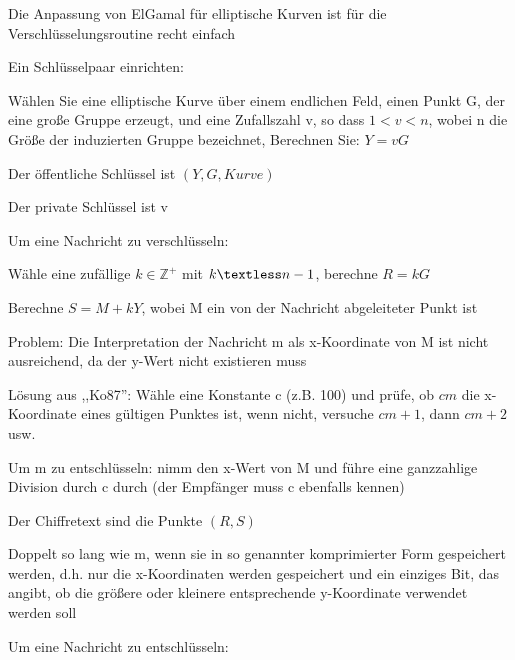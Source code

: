 \documentclass[a4paper]{article}
\begin{document}
\begin{multicols}{3}
      \begin{itemize*}
            \item Die Anpassung von ElGamal für elliptische Kurven ist für die
            Verschlüsselungsroutine recht einfach
            \item Ein Schlüsselpaar einrichten:
            \begin{itemize*}
                  \item Wählen Sie eine elliptische Kurve über einem endlichen Feld, einen Punkt G, der eine große Gruppe erzeugt, und eine Zufallszahl v, so dass $1 < v < n$, wobei n die Größe der induzierten Gruppe bezeichnet, Berechnen Sie: $Y = vG$
                  \item Der öffentliche Schlüssel ist $(Y,G,Kurve)$
                  \item Der private Schlüssel ist v
            \end{itemize*}
            \item Um eine Nachricht zu verschlüsseln:
            \begin{itemize*}
                  \item Wähle eine zufällige $k\in\mathbb{Z}^+$ mit $k\textless n-1$, berechne $R=kG$
                  \item Berechne $S=M+kY$, wobei M ein von der Nachricht abgeleiteter Punkt ist
                  \begin{itemize*} \item Problem: Die Interpretation der Nachricht m als x-Koordinate von M ist nicht ausreichend, da der y-Wert nicht existieren muss \item Lösung aus ,,Ko87'': Wähle eine Konstante c (z.B. 100) und prüfe, ob $cm$ die x-Koordinate eines gültigen Punktes ist, wenn nicht, versuche $cm+1$, dann $cm+2$ usw. \item Um m zu entschlüsseln: nimm den x-Wert von M und führe eine ganzzahlige Division durch c durch (der Empfänger muss c ebenfalls kennen) \end{itemize*}
                  \item Der Chiffretext sind die Punkte $(R,S)$
                  \item Doppelt so lang wie m, wenn sie in so genannter komprimierter Form gespeichert werden, d.h. nur die x-Koordinaten werden gespeichert und ein einziges Bit, das angibt, ob die größere oder kleinere entsprechende y-Koordinate verwendet werden soll
            \end{itemize*}
            \item Um eine Nachricht zu entschlüsseln:

\end{itemize*}
\end{multicols}
\end{document}
